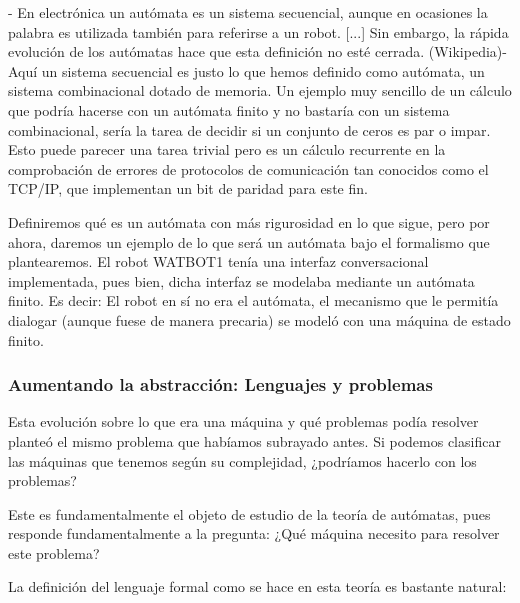 - En electrónica un autómata es un sistema secuencial, aunque en ocasiones la palabra es utilizada también para referirse a un robot. [...] Sin embargo, la rápida evolución de los autómatas hace que esta definición no esté cerrada. (Wikipedia)- \\

Aquí un sistema secuencial es justo lo que hemos definido como autómata, un sistema combinacional dotado de memoria.  Un ejemplo muy sencillo de un cálculo que podría hacerse con un autómata finito y no bastaría con un sistema combinacional, sería la tarea de decidir si un conjunto de ceros es par o impar. Esto puede parecer una tarea trivial pero es un cálculo recurrente en la comprobación de errores de protocolos de comunicación tan conocidos como el TCP/IP, que implementan un bit de paridad para este fin.

\vspace{10px}


Definiremos qué es un autómata con más rigurosidad en lo que sigue, pero por ahora, daremos un ejemplo de lo que será un autómata bajo el formalismo que plantearemos. El robot WATBOT1 tenía una interfaz conversacional implementada, pues bien, dicha interfaz se modelaba mediante un autómata finito. Es decir: El robot en sí no era el autómata, el mecanismo que le permitía dialogar (aunque fuese de manera precaria) se modeló con una máquina de estado finito.

\subsubsection{Aumentando la abstracción: Lenguajes y problemas }


Esta evolución sobre lo que era una máquina y qué problemas podía resolver planteó el mismo problema que habíamos subrayado antes. Si podemos clasificar las máquinas que tenemos según su complejidad, ¿podríamos hacerlo con los problemas?

\vspace{10px}

Este es fundamentalmente el objeto de estudio de la teoría de autómatas, pues responde fundamentalmente a la pregunta: ¿Qué máquina necesito para resolver este problema?

\vspace{10px}

La definición del lenguaje formal como se hace en esta teoría es bastante natural:

\vspace{10px}


